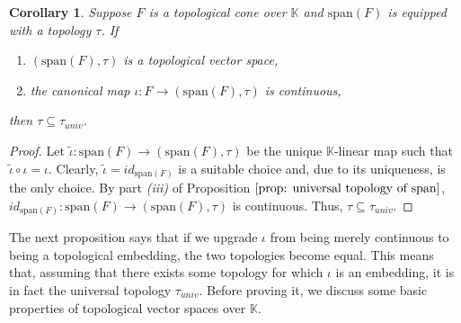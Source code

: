 \documentclass[a4paper,11pt]{article}
\numberwithin{equation}{section}
\theoremstyle{definition}
\newtheorem{Remark}[Definition]{Remark}
\theoremstyle{plain}
\newtheorem{Corollary}[Definition]{Corollary}
\newcommand{\spn}{\mathrm{span}}
\begin{document}
\begin{Corollary}\label{Corollary: univeral topology finest}
    Suppose $F$ is a topological cone over $\mathbb{K}$ and $\spn(F)$ is equipped with a topology $\tau$. If
    \begin{enumerate}
        \item $(\spn(F), \tau)$ is a topological vector space,
        \item the canonical map $\iota: F \longrightarrow (\spn(F), \tau)$ is continuous,
    \end{enumerate}
    then $\tau \subseteq \tau_{univ}$.
\end{Corollary}
\begin{proof}
    Let $\tilde{\iota}: \spn(F) \longrightarrow (\spn(F), \tau)$ be the unique $\mathbb{K}$-linear map such that $\tilde{\iota} \circ \iota = \iota$. Clearly, $\tilde{\iota} = id_{\spn(F)}$ is a suitable choice and, due to its uniqueness, is the only choice. By part \textit{(iii)} of Proposition $\ref{prop: universal topology of span}$, $id_{\spn(F)}: \spn(F) \longrightarrow (\spn(F), \tau)$ is continuous. Thus, $\tau \subseteq \tau_{univ}$.
\end{proof}

The next proposition says that if we upgrade $\iota$ from being merely continuous to being a topological embedding, the two topologies become equal. This means that, assuming that there exists some topology for which $\iota$ is an embedding, it is in fact the universal topology $\tau_{univ}$. Before proving it, we discuss some basic properties of topological vector spaces over $\mathbb{K}$. 

\end{document}
